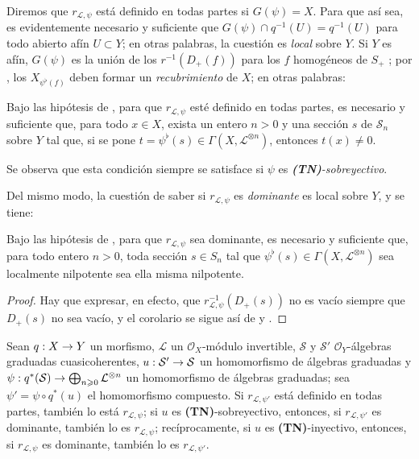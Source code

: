 \documentclass[oneside,10pt]{amsart}
\makeatletter
\renewcommand{\geq}{\geqslant}
\newcommand{\ega@arrow}[2]{\mathchoice{#1}{#2}{#2}{#2}}
\renewcommand{\to}{\ega@arrow{\longrightarrow}{\rightarrow}}
\newcommand{\oldpage}[2][]{\marginnote{\normalfont\footnotesize\textbf{#1}~|~#2}\ignorespaces}
\let\EGAOriginalLabel\label
\renewcommand{\label}[1]{\phantomsection\EGAOriginalLabel{#1}}
\makeatother
\begin{document}
Diremos que $r_{\mathcal{L},\psi}$ está definido en todas partes si $G(\psi)=X$.
Para que así sea, es evidentemente necesario y suficiente que $G(\psi)\cap q^{-1}(U)=q^{-1}(U)$ para todo abierto afín $U\subset Y$;
en otras palabras, la cuestión es \emph{local} sobre $Y$.
Si $Y$ es afín, $G(\psi)$ es la unión de los $r^{-1}(D_+(f))$ para los $f$ homogéneos de $S_+$ ;
por , los $X_{\psi^\flat(f)}$ deben formar un \emph{recubrimiento} de $X$;
en otras palabras:

\begin{corollary}[3.7.4]
\label{II.3.7.4-fr}
Bajo las hipótesis de , para que $r_{\mathcal{L},\psi}$ esté definido en todas partes, es necesario y suficiente que, para todo $x\in X$, exista un entero $n>0$ y una sección $s$ de $\mathcal{S}_n$ sobre $Y$ tal que, si se pone $t=\psi^\flat(s)\in\Gamma(X,\mathcal{L}^{\otimes n})$, entonces $t(x)\neq0$.
\end{corollary}

\oldpage[II]{67}
Se observa que esta condición siempre se satisface si $\psi$ es \emph{\textbf{(TN)}-sobreyectivo}.

Del mismo modo, la cuestión de saber si $r_{\mathcal{L},\psi}$ es \emph{dominante} es local sobre $Y$, y se tiene:

\begin{corollary}[3.7.5]
\label{II.3.7.5-fr}
Bajo las hipótesis de , para que $r_{\mathcal{L},\psi}$ sea dominante, es necesario y suficiente que, para todo entero $n>0$, toda sección $s\in S_n$ tal que $\psi^\flat(s)\in\Gamma(X,\mathcal{L}^{\otimes n})$ sea localmente nilpotente sea ella misma nilpotente.
\end{corollary}

\begin{proof}
Hay que expresar, en efecto, que $r_{\mathcal{L},\psi}^{-1}(D_+(s))$ no es vacío siempre que $D_+(s)$ no sea vacío, y el corolario se sigue así de  y .
\end{proof}

\begin{proposition}[3.7.6]
\label{II.3.7.6-fr}
Sean $q:X\to Y$ un morfismo, $\mathcal{L}$ un $\mathcal{O}_X$-módulo invertible, $\mathcal{S}$ y $\mathcal{S}'$ $\mathcal{O}_Y$-álgebras graduadas cuasicoherentes, $u:\mathcal{S}'\to\mathcal{S}$ un homomorfismo de álgebras graduadas y $\psi:q^*(\mathcal{S})\to\bigoplus_{n\geq0}\mathcal{L}^{\otimes n}$ un homomorfismo de álgebras graduadas;
sea $\psi'=\psi\circ q^*(u)$ el homomorfismo compuesto.
Si $r_{\mathcal{L},\psi'}$ está definido en todas partes, también lo está $r_{\mathcal{L},\psi}$;
si $u$ es \textup{\textbf{(TN)}}-sobreyectivo, entonces, si $r_{\mathcal{L},\psi'}$ es dominante, también lo es $r_{\mathcal{L},\psi}$;
recíprocamente, si $u$ es \textup{\textbf{(TN)}}-inyectivo, entonces, si $r_{\mathcal{L},\psi}$ es dominante, también lo es $r_{\mathcal{L},\psi'}$.
\end{proposition}
\end{document}
